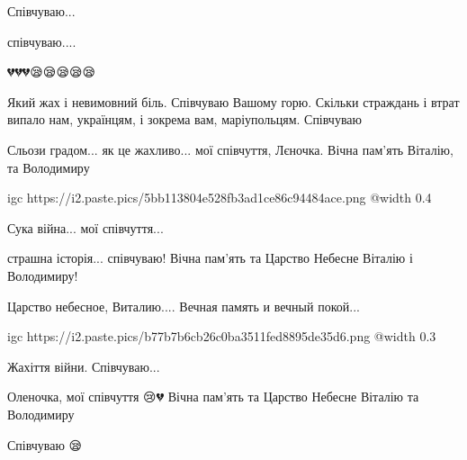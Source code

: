  
 
 
 
 

\qqSecCmt


Співчуваю...


співчуваю....


💔💔💔😪😪😪😪😪


Який жах і невимовний біль. Співчуваю Вашому горю. Скільки страждань і втрат
випало нам, українцям, і зокрема вам, маріупольцям. Співчуваю


Сльози градом... як це жахливо... мої співчуття, Лєночка. Вічна пам'ять
Віталію, та Володимиру


\ifcmt
  igc https://i2.paste.pics/5bb113804e528fb3ad1ce86c94484ace.png
  @width 0.4
\fi


Сука війна... мої співчуття...


страшна історія... співчуваю! Вічна пам'ять та Царство Небесне Віталію і Володимиру!


Царство небесное, Виталию.... Вечная память и вечный покой...

\ifcmt
  igc https://i2.paste.pics/b77b7b6cb26c0ba3511fed8895de35d6.png
  @width 0.3
\fi


Жахіття війни. Співчуваю...


Оленочка, мої співчуття 😢💔 Вічна пам'ять та Царство Небесне Віталію та
Володимиру 🙏😢😢😢


Співчуваю 😪

